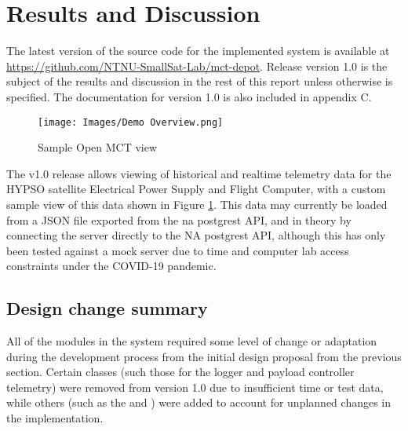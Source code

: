 \begin{comment}
What was good/bad about the implementation?
 - Initial design was too simple, and didn’t account for various complexities in the what was required for Open MCT and other sources
 - DB design: Was this good? Could it be done better after making changes to how Open MCT best works with data?

What worked, and what didn’t?
\end{comment}

\section{Results and Discussion}
The latest version of the source code for the implemented system is available at \url{https://github.com/NTNU-SmallSat-Lab/mct-depot}. Release version 1.0 is the subject of the results and discussion in the rest of this report unless otherwise is specified. The documentation for version 1.0 is also included in appendix C.

\begin{figure}[ht]
  \centering
  \texttt{[image: Images/Demo Overview.png]}
  \caption{Sample Open MCT view}
  \label{fig:demoview}
\end{figure}

The v1.0 release allows viewing of historical and realtime telemetry data for the HYPSO satellite Electrical Power Supply and Flight Computer, with a custom sample view of this data shown in Figure \ref{fig:demoview}. This data may currently be loaded from a JSON file exported from the \acrshort{na} \Gls{postgrest} API, and in theory by connecting the server directly to the NA \Gls{postgrest} API, although this has only been tested against a mock server due to time and computer lab access constraints under the COVID-19 pandemic.

\subsection{Design change summary}
All of the modules in the system required some level of change or adaptation during the development process from the initial design proposal from the previous section. Certain classes (such those for the logger and payload controller telemetry) were removed from version 1.0 due to insufficient time or test data, while others (such as the  and ) were added to account for unplanned changes in the implementation.

